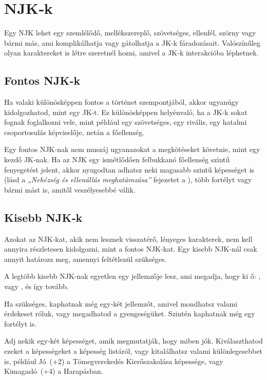 \section{NJK‑k}

Egy NJK lehet egy szemlélődő, mellékszereplő, szövetséges, ellenfél, szörny vagy bármi más, ami komplikálhatja vagy gátolhatja a JK‑k fáradozásait. Valószínűleg olyan karaktereket is létre szeretnél hozni, amivel a JK‑k interakcióba léphetnek.

\subsection{Fontos NJK‑k}

Ha valaki különösképpen fontos a történet szempontjából, akkor ugyanúgy kidolgozhatod, mint egy JK‑t. Ez különösképpen helyénvaló, ha a JK‑k sokat fognak foglalkozni vele, mint például egy szövetséges, egy rivális, egy hatalmi csoportosulás képviselője, netán a főellenség.

Egy fontos NJK‑nak nem muszáj ugyanazokat a megkötéseket követnie, mint egy kezdő JK‑nak. Ha az NJK egy ismétlődően felbukkanó főellenség szintű fenyegetést jelent, akkor nyugodtan adhatsz neki magasabb szintű képességet is (lásd a \textit{„Nehézség és ellenállás meghatározása”} fejezetet a ), több fortélyt vagy bármi mást is, amitől veszélyesebbé válik.

\subsection{Kisebb NJK‑k}

Azokat az NJK‑kat, akik nem lesznek visszatérő, lényeges karakterek, nem kell annyira részletesen kidolgozni, mint a fontos NJK‑kat. Egy kisebb NJK‑nál csak annyit határozz meg, amennyi feltétlenül szükséges.

A legtöbb kisebb NJK‑nak egyetlen egy jellemzője lesz, ami megadja, hogy ki ő: ,  vagy , és így tovább.

Ha szükséges, kaphatnak még egy‑két jellemzőt, amivel mondhatsz valami érdekeset róluk, vagy megadhatod a gyengeségüket. Szintén kaphatnak még egy fortélyt is.

Adj nekik egy‑két képességet, amik megmutatják, hogy miben jók. Kiválaszthatod ezeket a képességeket a képesség listáról, vagy kitalálhatsz valami különlegesebbet is, például Jó~(+2) a Tömegverekedés Kierőszakolása képessége, vagy Kimagasló~(+4) a Harapásban.

